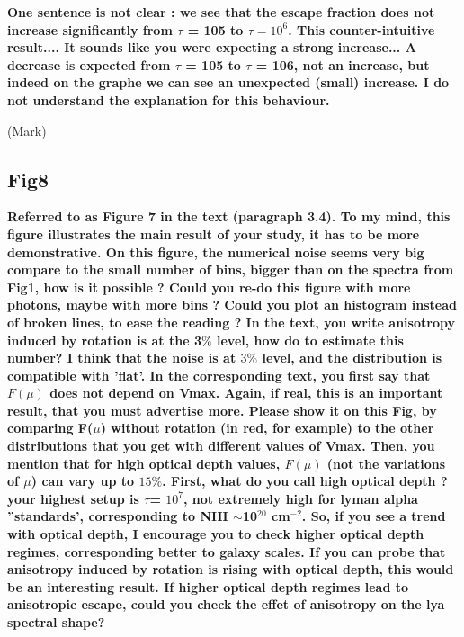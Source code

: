\documentclass[12pt]{article}
\begin{document}
{\bf One sentence is not clear : we see that the escape fraction does not increase significantly from $\tau$ = 105 to $\tau = 10^{6}$. This counter-intuitive result.... It sounds like you were expecting a strong increase... A decrease is expected from $\tau$ = 105 to $\tau$ = 106, not an increase, but indeed on the graphe we can see an unexpected (small) increase. I do not understand the explanation for this behaviour.}


(Mark)

\subsection*{Fig8}


{\bf Referred to as Figure 7 in the text (paragraph 3.4). To my mind,
  this figure illustrates the main result of your study, it has to be
  more demonstrative. On this figure, the numerical noise seems very
  big compare to the small number of bins, bigger than on the spectra
  from Fig1, how is it possible ? Could you re-do this figure with
  more photons, maybe with more bins ? Could you plot an histogram
  instead of broken lines, to ease the reading ? In the text, you
  write anisotropy induced by rotation is at the 3$\%$ level, how do
  to estimate this number? I think that the noise is at $3\%$ level,
  and the distribution is compatible with ’flat’. In the corresponding
  text, you first say that $F(\mu)$ does not depend on Vmax. Again, if
  real, this is an important result, that you must advertise
  more. Please show it on this Fig, by comparing F($\mu$) without rotation
  (in red, for example) to the other distributions that you get with
  different values of Vmax. Then, you mention that for high optical
  depth values, $F(\mu)$ (not the variations of $\mu$) can vary up to
  $15\%$. First, what do you call high optical depth ? your highest
  setup is $\tau$= $10^7$, not extremely high for lyman alpha ”standards’,
  corresponding to NHI $\sim$10$^{20}$ cm$^{-2}$. So, if you see a trend with
  optical depth, I encourage you to check higher optical depth
  regimes, corresponding better to galaxy scales. If you can probe
  that anisotropy induced by rotation is rising with optical depth,
  this would be an interesting result. If higher optical depth regimes
  lead to anisotropic escape, could you check the effet of anisotropy
  on the lya spectral shape?} 
\end{document}
